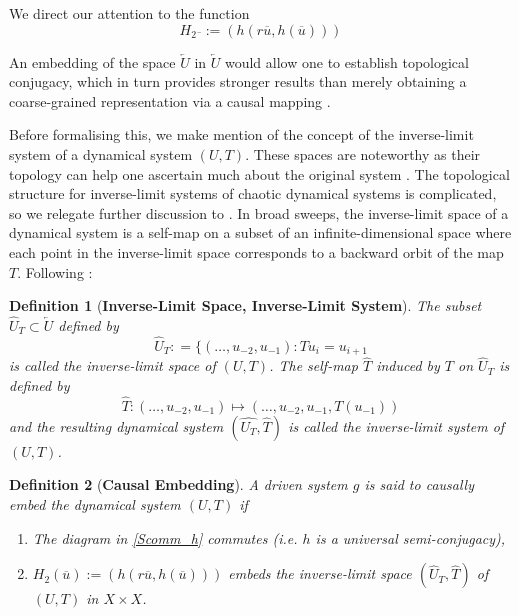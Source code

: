 \documentclass[a4paper,12pt,twoside]{report}
\newtheorem{Definition}{Definition}[]
\begin{document}
We direct our attention to the function \[H_2{\overline{}} := (h(r\overline{u}, h(\overline{u}))) \]

An embedding of the space $\overleftarrow{U}$  in $\overleftarrow{U}$ would allow one to establish topological conjugacy, which in turn provides stronger results than merely obtaining a coarse-grained representation via a causal mapping \cite{M: I feel this is very confusing to the reader as the co-domain of causal mapping is the left-infinite space and , so please omit if possible. You can just say we want to restrict inputs to the left-infinite orbits of a dynamical system and then explore conjugacy instead of a mere semi-conjugacy}. 


Before formalising this, we make mention of the concept of the inverse-limit system of a dynamical system $(U,T)$. 
These spaces are noteworthy as their topology can help one ascertain much about the original system \cite{Manju_IEEE}. The topological structure for inverse-limit systems of chaotic dynamical systems is complicated, so we relegate further discussion to \cite{kennedy2008inverse_limit, ingram2011inverse}.
In broad sweeps, the inverse-limit space of a dynamical system is a self-map on a subset of an infinite-dimensional space where each point in the inverse-limit space corresponds to a backward orbit of the map $T$. 
Following \cite{manjunath2021universal, ingram2011inverse}:

\begin{Definition}
  [\bf Inverse-Limit Space, Inverse-Limit System]\label{Dfn_InverseL}\rm
 The subset $\widehat{U}_T\subset \overleftarrow{U}$ defined by \[\widehat{U}_T: = \{ (\ldots,u_{-2},u_{-1}): Tu_{i} = u_{i+1}\]is called the inverse-limit space of $(U,T)$.
 The self-map $\widehat{T}$  induced by $T$ on $\widehat{U}_T$  is defined by \[\widehat{T}: (\ldots,u_{-2},u_{-1}) \mapsto  (\ldots,u_{-2},u_{-1},T(u_{-1}))\] and the resulting dynamical system $(\widehat{U_T}, \widehat{T})$ is called the inverse-limit system of $(U,T)$.
\end{Definition}

\begin{Definition}
  [\bf Causal Embedding]\label{Dfn_CausalEmbed}\rm
  A driven system $g$ is said to causally embed the dynamical system $(U,T)$ if 
  \vspace{-8mm}
\begin{enumerate}[noitemsep, label=\roman*.]
  \item The diagram in \ref{Scomm_h} commutes (i.e. $h$ is a universal semi-conjugacy),
  \item $H_2(\overline{u}):=(h(r\overline{u}, h(\overline{u})))$ embeds the inverse-limit space $(\widehat{U}_T, \hat{T})$ of $(U,T)$ in $X\times{X}$.
\end{enumerate}
\end{Definition}
\end{document}
